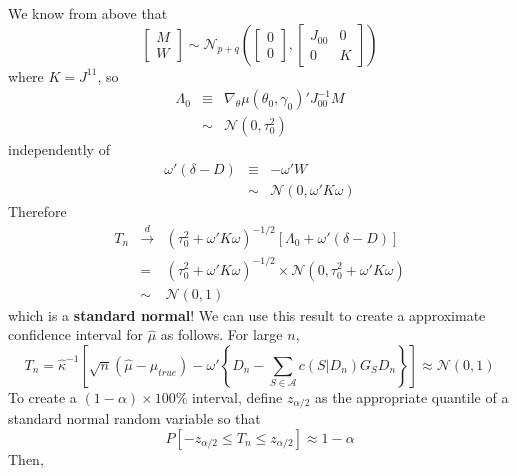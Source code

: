 \documentclass[12pt]{article}
\theoremstyle{definition}
\begin{document}
We know from above that
	$$
	\left[\begin{array}{c}
		M\\
		W
	\end{array}\right] \sim \mathcal{N}_{p+q}\left(
	\left[\begin{array}{c}
		0\\
		0
	\end{array}\right],
	\left[\begin{array}{cc}
		J_{00}&0\\
		0&K
	\end{array}\right]\right)
$$
where $K = J^{11}$, so
	\begin{eqnarray*}
		\Lambda_0 &\equiv& \nabla_\theta \mu(\theta_0,\gamma_0)' J_{00}^{-1} M\\
			&\sim&  \mathcal{N}\left(0, \tau_0^2\right)
\end{eqnarray*}
independently of
	\begin{eqnarray*}
		\omega'\left( \delta - D\right)&\equiv&- \omega'W\\
			&\sim& \mathcal{N}\left(0, \omega'K\omega \right)
\end{eqnarray*}
Therefore
	\begin{eqnarray*}
		T_n &\overset{d}{\rightarrow}& (\tau_0^2 + \omega' K \omega)^{-1/2}\left[\Lambda_0 + \omega'\left( \delta - D\right)\right] \\
		&=& (\tau_0^2 + \omega' K \omega)^{-1/2} \times \mathcal{N}\left(0, \tau_0^2 + \omega'K\omega\right)\\
		&\sim& \mathcal{N}\left(0,1 \right)
\end{eqnarray*}
which is a \textbf{standard normal}! We can use this result to create a approximate confidence interval for $\hat{\mu}$ as follows. For large $n$, 
	$$T_n =\widehat{\kappa}^{-1}\left[\sqrt{n}(\hat{\mu} - \mu_{true})  - \omega'\left\{D_n -  \sum_{S\in \mathcal{A}} c(S|D_n)G_S D_n \right\} \right] \approx \mathcal{N}(0,1)$$
To create a $(1-\alpha)\times 100\%$ interval, define $z_{\alpha/2}$ as the appropriate quantile of a standard normal random variable so that
	$$P \left[-z_{\alpha/2} \leq T_n \leq z_{\alpha/2} \right] \approx 1-\alpha $$
Then,
\end{document}
